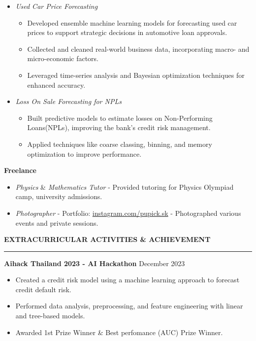 \documentclass[a4paper, 11pt]{article}
\begin{document}
\begin{itemize}[topsep=0pt, parsep=0pt]
    \item \textit{Used Car Price Forecasting}
    {\fontsize{11pt}{11pt}\selectfont
    \begin{itemize}[noitemsep, topsep=0pt, partopsep=0pt, parsep=0pt, leftmargin=*]
        \item Developed ensemble machine learning models for forecasting used car prices to support strategic decisions in automotive loan approvals.
        \item Collected and cleaned real-world business data, incorporating macro- and micro-economic factors.
        \item Leveraged time-series analysis and Bayesian optimization techniques for enhanced accuracy.
    \end{itemize}
    }
    \item \textit{Loss On Sale Forecasting for NPLs}
    {\fontsize{11pt}{11pt}\selectfont
    \begin{itemize}[noitemsep, topsep=0pt, partopsep=0pt, parsep=0pt, leftmargin=*]
        \item Built predictive models to estimate losses on Non-Performing Loans(NPLs), improving the bank's credit risk management.
        \item Applied techniques like coarse classing, binning, and memory optimization to improve performance.
    \end{itemize}
    }
\end{itemize}

\textbf{Freelance}
\begin{itemize}[noitemsep, topsep=0pt, partopsep=0pt, parsep=0pt]
    \item \textit{Physics} \& \textit{Mathematics Tutor} - Provided tutoring for Physics Olympiad camp, university admissions.
    \item \textit{Photographer} - Portfolio: \href{https://www.instagram.com/pupick.sk/}{instagram.com/pupick.sk} - Photographed various events and private sessions.
\end{itemize}

\vspace{6pt}
\textbf{EXTRACURRICULAR ACTIVITIES \& ACHIEVEMENT}
\vspace{5pt}
{\color{NavyBlue}\hrule}
\vspace{6pt}

\textbf{Aihack Thailand 2023 - AI Hackathon} \hfill December 2023
\begin{itemize}[noitemsep, topsep=0pt, partopsep=0pt, parsep=0pt]
    \item Created a credit risk model using a machine learning approach to forecast credit default risk.
    \item Performed data analysis, preprocessing, and feature engineering with linear and tree-based models.
    \item Awarded 1st Prize Winner \& Best perfomance (AUC) Prize Winner.
\end{itemize}
\end{document}
